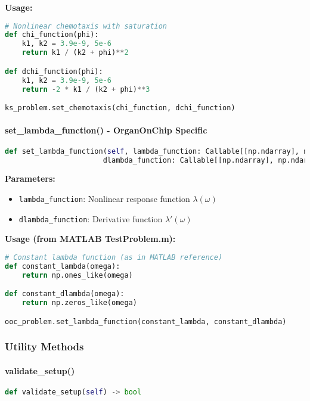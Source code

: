 \textbf{Usage:}
\begin{lstlisting}[language=Python, caption=Chemotaxis Function Example]
# Nonlinear chemotaxis with saturation
def chi_function(phi):
    k1, k2 = 3.9e-9, 5e-6
    return k1 / (k2 + phi)**2

def dchi_function(phi):
    k1, k2 = 3.9e-9, 5e-6
    return -2 * k1 / (k2 + phi)**3

ks_problem.set_chemotaxis(chi_function, dchi_function)
\end{lstlisting}

\paragraph{set\_lambda\_function() - OrganOnChip Specific}
\begin{lstlisting}[language=Python, caption=Set Lambda Function]
def set_lambda_function(self, lambda_function: Callable[[np.ndarray], np.ndarray],
                       dlambda_function: Callable[[np.ndarray], np.ndarray])
\end{lstlisting}

\textbf{Parameters:}
\begin{itemize}
    \item \texttt{lambda\_function}: Nonlinear response function $\lambda(\omega)$
    \item \texttt{dlambda\_function}: Derivative function $\lambda'(\omega)$
\end{itemize}

\textbf{Usage (from MATLAB TestProblem.m):}
\begin{lstlisting}[language=Python, caption=Lambda Function Example]
# Constant lambda function (as in MATLAB reference)
def constant_lambda(omega):
    return np.ones_like(omega)

def constant_dlambda(omega):
    return np.zeros_like(omega)

ooc_problem.set_lambda_function(constant_lambda, constant_dlambda)
\end{lstlisting}

\subsubsection{Utility Methods}

\paragraph{validate\_setup()}
\begin{lstlisting}[language=Python, caption=Validate Setup Method]
def validate_setup(self) -> bool
\end{lstlisting}

